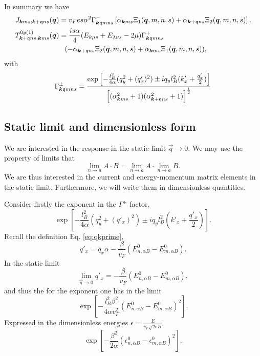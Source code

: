 \begin{summary}
  In summary we have
  \begin{align}
    \label{eq:99}
    J_{\vec{k} m s; \vec{k} + \qvec{q} n s} (\vec{q}) &=
                                                        v_{F} e s \alpha^2
                                                        \Gamma ^-_{\vec{k} \qvec{q} m n s}
                                                        \left[ \alpha _{\vec{k} m s} \Xi_{1} (\vec{q}, m, n, s)
                                                        + \alpha _{\vec{k} + \qvec{q} n s} \Xi _{2} (\vec{q}, m, n, s) \right],\\
    T_{\vec{k} + \qvec{q} n s, \vec{k} m s}^{0y (1)} (\vec{q}) &=
                                                                 \frac{is \alpha}{4  }
                                                                 (E_{k\mu s} + E_{\lambda  \nu  s} - 2 \mu) \Gamma ^+_{\vec{k} \qvec{q} m n s} \\
                                                      &\pe (- \alpha_{\vec{k}+ \qvec{q} n s} \Xi_{2} (\bar{\vec{q}}, m, n, s) + \alpha_{\vec{k} m s} \Xi_{1}(\bar{\vec{q}}, m, n, s)),
  \end{align}
  with
  \[
    \Gamma _{\bm{k} \mathfrak{q} m n s}^{\pm} =
    \frac{
      \exp
      \left[
        - \frac{l_{B}^2}{4 \alpha } (q_{y}^2 + (q' _x)^2) \pm  i q_y l_B^2 (k' _x + \frac{q'_x}{2} )
      \right]
    }{
      \left[(\alpha_{\bm{k} m s}^2 +1) (\alpha_{\bm{k} + \mathfrak{q} ns} ^2 + 1)\right]^{\frac{1}{2}}
    }
  \]
\end{summary}
\subsection{Static limit and dimensionless form}
We are interested in the response in the static limit \( \vec{q} \to  0 \).
We may use the property of limits that
\[
  \lim_{n \to a} A \cdot  B = \lim_{n \to a} A \cdot \lim_{n \to a} B.
\]
We are thus interested in the current and energy-momentum matrix elements in the static limit.
Furthermore, we will write them in dimensionless quantities.

Consider firstly the exponent in the \( \Gamma ^{\pm } \) factor,
\[
  \exp
  \left[
    - \frac{l_{B}^2}{4 \alpha } (q_{y}^2 + (q' _x)^2) \pm  i q_y l_B^2 (k' _x + \frac{q'_x}{2} )
  \right].
\]
Recall the definition Eq. \eqref{eq:qkprime},
\begin{equation*}
  q' _x = q_x \alpha  - \frac{\beta}{v_{F} }( E^0_{n,\alpha B} - E^0_{m, \alpha B} ).
\end{equation*}
In the static limit
\[
  \lim_{\vec{q} \to 0} q'_x = - \frac{\beta}{v_{F}}( E^0_{n,\alpha B} - E^0_{m, \alpha B} ),
\]
and thus the for the exponent one has in the limit
\[
  \exp
  \left[
    - \frac{l_{B}^2 \beta ^2}{4 \alpha v_F^2} ( E^0_{n,\alpha B} - E^0_{m, \alpha B} )^2
  \right].
\]
Expressed in the dimensionless energies \( \epsilon = \frac{E}{v_{F} \sqrt{2 e B} } \)
\[
  \exp
  \left[
    - \frac{\beta ^2 }{2 \alpha} ( \epsilon ^0_{n,\alpha B} - \epsilon ^0_{m, \alpha B} )^2
  \right].
\]

